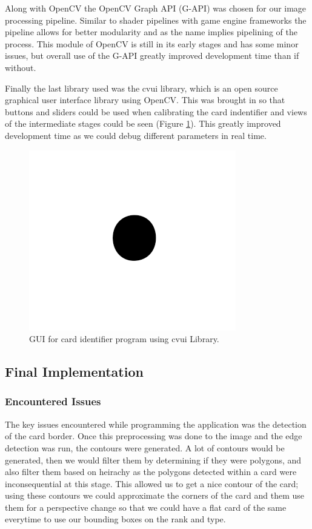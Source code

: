 \documentclass[conference]{IEEEtran}
\begin{document}
Along with OpenCV the OpenCV Graph API (G-API) was chosen for our image processing pipeline. Similar
to shader pipelines with game engine frameworks the pipeline allows for better modularity and as the
name implies pipelining of the process. This module of OpenCV is still in its early stages and has
some minor issues, but overall use of the G-API greatly improved development time than if without.

Finally the last library used was the cvui library, which is an open source graphical user interface
library using OpenCV. This was brought in so that buttons and sliders could be used when calibrating
the card indentifier and views of the intermediate stages could be seen (Figure \ref{fig:gui}). This
greatly improved development time as we could debug different parameters in real time.

\begin{figure}[htbp]
\centerline{\includegraphics{fig1.png}}
\caption{GUI for card identifier program using cvui Library.}
\label{fig:gui}
\end{figure}


\subsection{Final Implementation}

\subsubsection{Encountered Issues}
The key issues encountered while programming the application was the detection of the card border.
Once this preprocessing was done to the image and the edge detection was run, the contours were
generated. A lot of contours would be generated, then we would filter them by determining if they
were polygons, and also filter them based on heirachy as the polygons detected within a card were
inconsequential at this stage. This allowed us to get a nice contour of the card; using these
contours we could approximate the corners of the card and them use them for a perspective change so
that we could have a flat card of the same everytime to use our bounding boxes on the rank and type.
\end{document}
